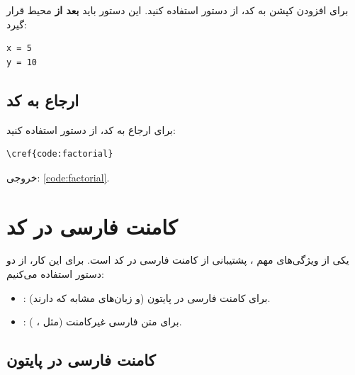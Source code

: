 برای افزودن کپشن به کد، از دستور 
استفاده کنید. این دستور باید \textbf{بعد از}
محیط  قرار گیرد:

\begin{latin}
\begin{verbatim}
x = 5
y = 10
\end{verbatim}
\end{latin}
\label{code:two-vars}


\subsection{ارجاع به کد}
\label{sec:code-reference}

برای ارجاع به کد، از دستور  استفاده
کنید:

\begin{latin}
\begin{verbatim}
\cref{code:factorial}
\end{verbatim}
\end{latin}

خروجی: \cref{code:factorial}.


\section{کامنت فارسی در کد}
\label{sec:code-persian-comments}

یکی از ویژگی‌های مهم ، پشتیبانی
از کامنت فارسی در کد است. برای این کار، از دو
دستور استفاده می‌کنیم:

\begin{itemize}
    \item {}: برای کامنت فارسی
    در پایتون (و زبان‌های مشابه که \lr{\#}
    دارند).
    \item {}: برای متن فارسی غیرکامنت
    (مثل ، ).
\end{itemize}


\subsection{کامنت فارسی در پایتون}
\label{sec:code-pcc}

